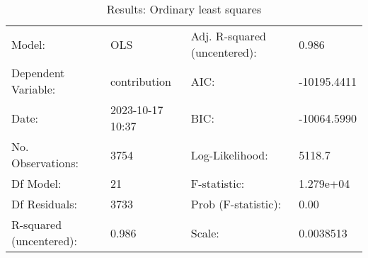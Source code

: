 \begin{table}
\caption{Results: Ordinary least squares}
\label{}
\begin{center}
\begin{tabular}{llll}
\hline
Model:                  & OLS              & Adj. R-squared (uncentered): & 0.986        \\
Dependent Variable:     & contribution     & AIC:                         & -10195.4411  \\
Date:                   & 2023-10-17 10:37 & BIC:                         & -10064.5990  \\
No. Observations:       & 3754             & Log-Likelihood:              & 5118.7       \\
Df Model:               & 21               & F-statistic:                 & 1.279e+04    \\
Df Residuals:           & 3733             & Prob (F-statistic):          & 0.00         \\
R-squared (uncentered): & 0.986            & Scale:                       & 0.0038513    \\
\hline
\end{tabular}
\end{center}


\end{table}
